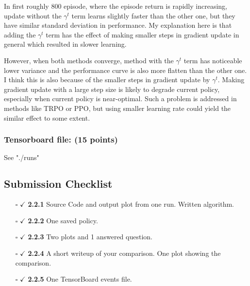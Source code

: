 \documentclass{article}
\begin{document}
In first roughly 800 episode, where the episode return is rapidly increasing, update without the $ \gamma^t $ term learns slightly faster than the other one, but they have similar standard deviation in performance. My explanation here is that adding the $ \gamma^t $ term has the effect of making smaller steps in gradient update in general which resulted in slower learning.

However, when both methods converge, method with the $ \gamma^t $ term has noticeable lower variance and the performance curve is also more flatten than the other one. I think this is also because of the smaller steps in gradient update by $ \gamma^t $. Making gradient update with a large step size is likely to degrade current policy, especially when current policy is near-optimal. Such a problem is addressed in methods like TRPO or PPO, but using smaller learning rate could yield the similar effect to some extent.


\subsubsection{Tensorboard file: (15 points)}

See "./runs"


\subsection{Submission Checklist}


\begin{itemize}
    \item[$\square$] \hspace{-15px} $\checkmark$ \textbf{2.2.1} Source Code and output plot from one run. Written algorithm.
    \item[$\square$] \hspace{-15px} $\checkmark$
    \textbf{2.2.2} One saved policy.
    \item[$\square$] \hspace{-15px} $\checkmark$
    \textbf{2.2.3} Two plots and 1 answered question.
    \item[$\square$] \hspace{-15px} $\checkmark$
    \textbf{2.2.4} A short writeup of your comparison. One plot showing the comparison.
    \item[$\square$] \hspace{-15px} $\checkmark$
    \textbf{2.2.5} One TensorBoard events file.
\end{itemize}
\end{document}
